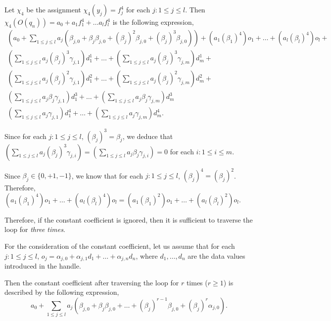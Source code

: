 \documentclass[runningheads,a4paper]{llncs}
\begin{document}
Let $\chi_4$ be the assignment $\chi_4(y_j)=f^4_j$ for each $j: 1\le j \le l$.
Then $\chi_4(O(q_n)) = a_0+ a_1 f^4_1 + \dots a_l f^4_l$ is the following expression,
\[
\begin{array}{l}
(a_0 + \sum \limits_{1 \le j \le l} a_j (\beta_{j,0} + \beta_{j} \beta_{j,0} + (\beta_j)^2 \beta_{j,0} + (\beta_j)^3 \beta_{j,0})) +  (a_1 (\beta_1)^4) o_1 + \dots + (a_l (\beta_l)^4) o_l + \\
 (\sum \limits_{1 \le j \le l} a_j (\beta_{j})^3\gamma_{j,1}) d^1_1 + \dots + (\sum \limits_{1 \le j \le l} a_j (\beta_{j})^3\gamma_{j,m}) d^1_m + \\
 (\sum \limits_{1 \le j \le l} a_j (\beta_{j})^2\gamma_{j,1}) d^2_1 + \dots + (\sum \limits_{1 \le j \le l} a_j (\beta_{j})^2\gamma_{j,m}) d^2_m + \\
(\sum \limits_{1 \le j \le l} a_j \beta_j \gamma_{j,1}) d^3_1 + \dots + (\sum \limits_{1 \le j \le l} a_j \beta_j \gamma_{j,m}) d^3_m \\
(\sum \limits_{1 \le j \le l} a_j \gamma_{j,1}) d^4_1 + \dots + (\sum \limits_{1 \le j \le l} a_j \gamma_{j,m}) d^4_m. 
\end{array}
\]

Since for each $j: 1\le j \le l$, $(\beta_j)^3=\beta_j$, we deduce that $(\sum \limits_{1 \le j \le l} a_j (\beta_{j})^3\gamma_{j,i}) = (\sum \limits_{1 \le j \le l} a_j \beta_{j} \gamma_{j,i}) =0$ for each $i: 1\le i \le m$.

Since $\beta_j \in \{0,+1,-1\}$, we know that for each $j: 1\le j \le l$, $(\beta_j)^4=(\beta_j)^2$. Therefore, $(a_1 (\beta_1)^4) o_1 + \dots + (a_l (\beta_l)^4) o_l=(a_1 (\beta_1)^2) o_1 + \dots + (a_l (\beta_l)^2) o_l$.

Therefore, if the constant coefficient is ignored, then it is sufficient to traverse the loop for \emph{three times}.

For the consideration of the constant coefficient, let us assume that for each $j: 1 \le j \le l$, 
$o_j = \alpha_{j,0} + \alpha_{j,1} d_1+ \dots + \alpha_{j,n}d_n$, where $d_1,\dots,d_n$ are the data values introduced in the handle.

Then the constant coefficient after traversing the loop for $r$ times ($r \ge 1$) is described by the following expression,
\[a_0 + \sum \limits_{1 \le j \le l} a_j (\beta_{j,0} + \beta_{j} \beta_{j,0} + \dots + (\beta_j)^{r-1} \beta_{j,0} + (\beta_j)^r \alpha_{j,0}).\]
\end{document}
